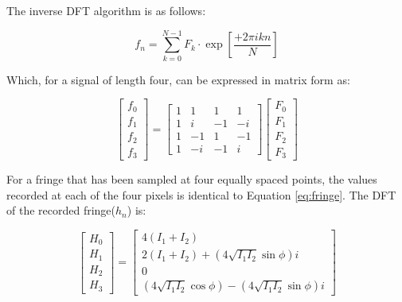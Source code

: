 \documentclass[10pt,letterpaper]{article}
\begin{document}
The inverse DFT algorithm is as follows:

\begin{equation}
f_n=\sum_{k=0}^{N-1}F_k\cdot \exp\left[\frac{+2\pi ikn}{N}\right]
\label{eq:iDFT}
\end{equation}

Which, for a signal of length four, can be expressed in matrix form as:

\begin{equation}
\left[
\begin{matrix}
f_0\\
f_1\\
f_2\\
f_3
\end{matrix}
\right]
=
\left[
\begin{matrix}
1 & 1 & 1 & 1\\
1 & i & -1 & -i\\
1 & -1 & 1 & -1\\
1 & -i & -1 & i
\end{matrix}
\right]
\left[
\begin{matrix}
F_0\\
F_1\\
F_2\\
F_3
\end{matrix}
\right]
\end{equation}

For a fringe that has been sampled at four equally spaced points, the values recorded at each of the four pixels is identical to Equation \ref{eq:fringe}. The DFT of the recorded fringe($h_n$) is:

\begin{equation}
\left[
\begin{matrix}
H_0\\
H_1\\
H_2\\
H_3
\end{matrix}
\right]
=
\left[
\begin{matrix}
4(I_1+I_2)\\
2(I_1+I_2)+(4\sqrt{I_1I_2}\sin\phi)i\\
0\\
(4\sqrt{I_1I_2}\cos\phi)-(4\sqrt{I_1I_2}\sin\phi)i
\end{matrix}
\right]
\end{equation}
\end{document}
